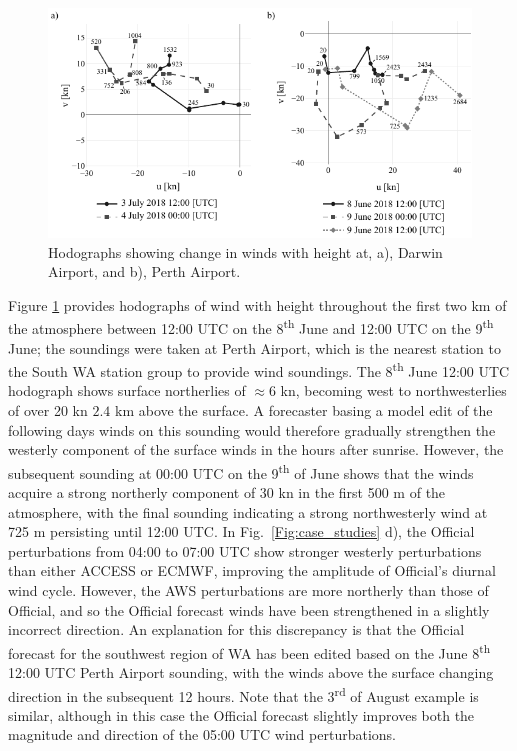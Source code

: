 \documentclass[alpha-refs]{wiley-article}
\begin{document}
\begin{figure}
\centering
\includegraphics{perth_sounding.pdf}
\caption{Hodographs showing change in winds with height at, a), Darwin Airport, and b), Perth Airport.}
\label{Fig:perth_sounding}
\end{figure}

Figure \ref{Fig:perth_sounding} provides hodographs of wind with height throughout the first two km of the atmosphere between 12:00 UTC on the 8\textsuperscript{th} June and 12:00 UTC on the 9\textsuperscript{th} June; the soundings were taken at Perth Airport, which is the nearest station to the South WA station group to provide wind soundings. The 8\textsuperscript{th} June 12:00 UTC hodograph shows surface northerlies of $\approx 6$ kn, becoming west to northwesterlies of over 20 kn $2.4$ km above the surface. A forecaster basing a model edit of the following days winds on this sounding would therefore gradually strengthen the westerly component of the surface winds in the hours after sunrise. However, the subsequent sounding at 00:00 UTC on the 9\textsuperscript{th} of June shows that the winds acquire a strong northerly component of 30 kn in the first 500 m of the atmosphere, with the final sounding indicating a strong northwesterly wind at 725 m persisting until 12:00 UTC. In Fig.~\ref{Fig:case_studies} d), the Official perturbations from 04:00 to 07:00 UTC show stronger westerly perturbations than either ACCESS or ECMWF, improving the amplitude of Official's diurnal wind cycle. However, the AWS perturbations are more northerly than those of Official, and so the Official forecast winds have been strengthened in a slightly incorrect direction. An explanation for this discrepancy is that the Official forecast for the southwest region of WA has been edited based on the June 8\textsuperscript{th} 12:00 UTC Perth Airport sounding, with the winds above the surface changing direction in the subsequent 12 hours. Note that the 3\textsuperscript{rd} of August example is similar, although in this case the Official forecast slightly improves both the magnitude and direction of the 05:00 UTC wind perturbations.
\end{document}
